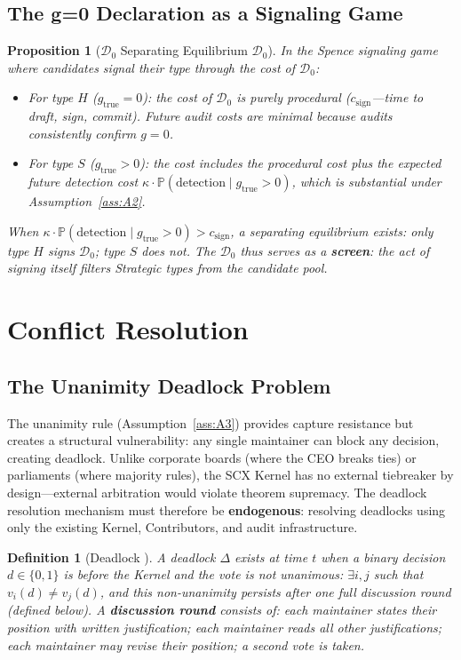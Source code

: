 \documentclass[12pt,a4paper]{article}
\newtheorem{proposition}[theorem]{Proposition}
\newtheorem{definition}[theorem]{Definition}
\theoremstyle{definition}
\newcommand{\Pbb}{\mathbb{P}}
\newcommand{\gzero}{g=0}
\newcommand{\GzeroDecl}{\mathcal{D}_{0}}
\newcommand{\deadlockSym}{\Delta}
\begin{document}
\subsection{The g=0 Declaration as a Signaling Game}
\begin{proposition}[$\GzeroDecl$ Separating Equilibrium $\GzeroDecl$]
\label{prop:signaling}
In the Spence signaling game~\cite{Spence1973} where candidates signal their type through the cost of $\GzeroDecl$:
\begin{itemize}
    \item For type $H$ ($g_{\mathrm{true}} = 0$): the cost of $\GzeroDecl$ is purely procedural ($c_{\text{sign}}$---time to draft, sign, commit). Future audit costs are minimal because audits consistently confirm $\gzero$.
    \item For type $S$ ($g_{\mathrm{true}} > 0$): the cost includes the procedural cost \textit{plus} the expected future detection cost $\kappa \cdot \Pbb(\text{detection} \mid g_{\mathrm{true}} > 0)$, which is substantial under Assumption~\ref{ass:A2}.
\end{itemize}
When $\kappa \cdot \Pbb(\text{detection} \mid g_{\mathrm{true}} > 0) > c_{\text{sign}}$, a separating equilibrium exists: only type $H$ signs $\GzeroDecl$; type $S$ does not. The $\GzeroDecl$ thus serves as a \textbf{screen}: the act of signing itself filters Strategic types from the candidate pool.
\end{proposition}
\section{Conflict Resolution}
\label{sec:conflict}
\subsection{The Unanimity Deadlock Problem}
The unanimity rule (Assumption~\ref{ass:A3}) provides capture resistance but creates a structural vulnerability: any single maintainer can block any decision, creating deadlock. Unlike corporate boards (where the CEO breaks ties) or parliaments (where majority rules), the SCX Kernel has no external tiebreaker by design---external arbitration would violate theorem supremacy. The deadlock resolution mechanism must therefore be \textbf{endogenous}: resolving deadlocks using only the existing Kernel, Contributors, and audit infrastructure.
\begin{definition}[Deadlock ]
\label{def:deadlock}
A deadlock $\deadlockSym$ exists at time $t$ when a binary decision $d \in \{0, 1\}$ is before the Kernel and the vote is not unanimous: $\exists i, j$ such that $v_i(d) \neq v_j(d)$, and this non-unanimity persists after one full discussion round (defined below). A \textbf{discussion round} consists of: each maintainer states their position with written justification; each maintainer reads all other justifications; each maintainer may revise their position; a second vote is taken.
\end{definition}
\end{document}
